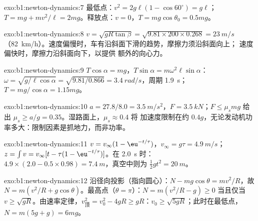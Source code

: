 \begin{solution}{exo:b1:newton-dynamics:7}
最低点：$v^2 = 2g\ell(1 - \cos 60^\circ) = g\ell$；$T = mg + mv^2/\ell =
2mg$。释放点：$v = 0$，$T = mg\cos\theta_0 = 0.5mg$。
\end{solution}

\begin{solution}{exo:b1:newton-dynamics:8}
$v = \sqrt{gR\tan\beta} = \sqrt{9.81 \times 200 \times 0.268} = \qty{23}{m/s}$
（\qty{82}{km/h}）。速度偏慢时，车有沿斜面下滑的趋势，摩擦力须沿斜面向上；
速度偏快时，摩擦力沿斜面向下，以提供
额外的向心力。
\end{solution}

\begin{solution}{exo:b1:newton-dynamics:9}
$T\cos\alpha = mg$，$T\sin\alpha = m\omega^2\ell\sin\alpha$：$\omega =
\sqrt{g/\ell\cos\alpha} = \sqrt{9.81/0.866} = \qty{3.4}{rad/s}$，周期
\qty{1.9}{s}；$T = mg/\cos\alpha = 1.15mg$。
\end{solution}

\begin{solution}{exo:b1:newton-dynamics:10}
$a = 27.8/8.0 = \qty{3.5}{m/s^2}$，$F = \qty{3.5}{kN}$；$F \leq \mu_smg$
给出 $\mu_s \geq a/g = 0.35$。湿路面上，$\mu_s \approx 0.4$ 将
加速度限制在约 $0.4g$，无论发动机功率多大：限制因素是抓地力，而非功率。
\end{solution}

\begin{solution}{exo:b1:newton-dynamics:11}
$v = v_\infty(1 - \eu^{-t/\tau})$，$v_\infty = g\tau = \qty{4.9}{m/s}$；
$z = \int v = v_\infty[t - \tau(1 - \eu^{-t/\tau})]$。在 \qty{2.0}{s} 时：
$4.9 \times (2.0 - 0.5 \times 0.98) = \qty{7.4}{m}$，真空中则为 $\tfrac12 gt^2
= \qty{20}{m}$。
\end{solution}

\begin{solution}{exo:b1:newton-dynamics:12}
沿径向投影（指向圆心）：$N - mg\cos\theta = mv^2/R$，故
$N = m(v^2/R + g\cos\theta)$。最高点（$\theta = \pi$）：$N = m(v^2/R - g)
\geq 0$ 当且仅当 $v \geq \sqrt{gR}$。由速率定律，$v_{\text{顶}}^2 =
v_0^2 - 4gR \geq gR$：$v_0 \geq \sqrt{5gR}$；此时在最低点，$N =
m(5g + g) = 6mg$。
\end{solution}

